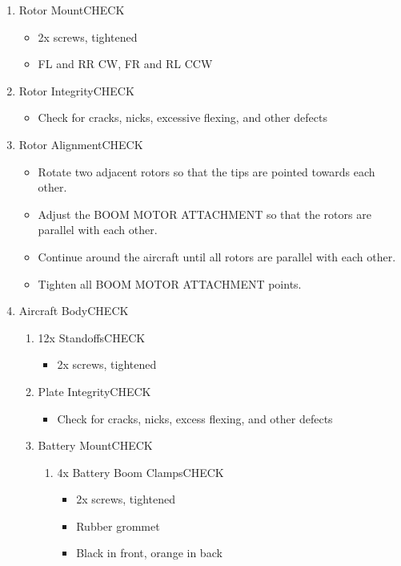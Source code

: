 \documentclass{report}
\begin{document}
\begin{enumerate}
			\item Rotor Mount\hrulefill CHECK
				\begin{itemize}
					\item 2x screws, tightened
					\item FL and RR CW, FR and RL CCW
				\end{itemize}
			\item Rotor Integrity\hrulefill CHECK
				\begin{itemize}
					\item Check for cracks, nicks, excessive flexing, and other defects
				\end{itemize}
			\item Rotor Alignment\hrulefill CHECK
				\begin{itemize}
					\item Rotate two adjacent rotors so that the tips are pointed towards each other.
					\item Adjust the BOOM MOTOR ATTACHMENT so that the rotors are parallel with each other.
					\item Continue around the aircraft until all rotors are parallel with each other.
					\item Tighten all BOOM MOTOR ATTACHMENT points.
				\end{itemize}
			\item Aircraft Body\hrulefill CHECK
				\begin{enumerate}
					\item 12x Standoffs\hrulefill CHECK
						\begin{itemize}
							\item 2x screws, tightened
						\end{itemize}
					\item Plate Integrity\hrulefill CHECK
						\begin{itemize}
							\item Check for cracks, nicks, excess flexing, and other defects
						\end{itemize}
					\item Battery Mount\hrulefill CHECK
						\begin{enumerate}
							\item 4x Battery Boom Clamps\hrulefill CHECK
								\begin{itemize}
									\item 2x screws, tightened
									\item Rubber grommet
									\item Black in front, orange in back

\end{itemize}
\end{enumerate}
\end{enumerate}
\end{enumerate}
\end{document}
